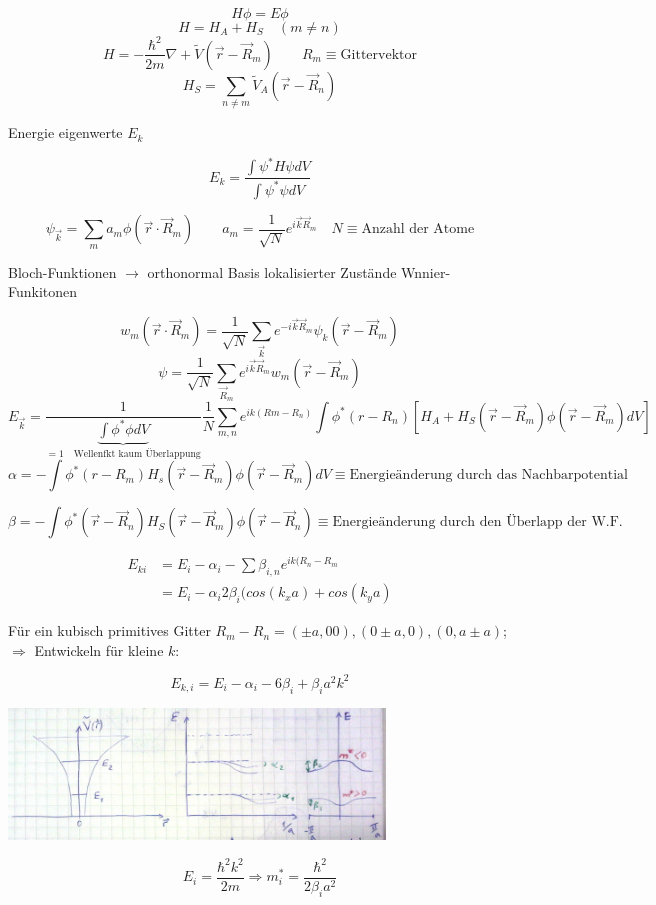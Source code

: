 \[H\phi = E\phi\]
\[H= H_A+H_S\quad (m\neq n)\]
\[H = -\frac{\hbar^2}{2m}\nabla + \tilde V(\vec r - \vec R_m)\qquad R_m\equiv\text{Gittervektor}\]
\[H_S = \sum_{n\neq m}\tilde V_A(\vec r - \vec R_n)\]

Energie eigenwerte \(E_k\)

\[ E_k = \frac{\int \psi^* H\psi dV}{\int \psi^*\psi dV}\]

 \[\psi_{\vec k} = \sum_m a_m\phi(\vec r\cdot\vec R_m)\qquad a_m=\frac{1}{\sqrt{N}} e^{i\vec k\vec R_m}\quad N\equiv\text{Anzahl der Atome}\]


Bloch-Funktionen \(\rightarrow \) orthonormal Basis lokalisierter Zustände Wnnier-Funkitonen

\[w_m(\vec r\cdot\vec R_m) = \frac{1}{\sqrt{N}}\sum_{\vec k}e^{-i\vec k\vec R_m}\psi_k(\vec r- \vec R_m)\]
\[\psi =\frac{1}{\sqrt{N}}\sum_{\vec R_m}e^{i\vec k\vec R_m}w_m(\vec r- \vec R_m) \]
\[E_{\vec k} = \frac{1}{\underbrace{\int \phi^*\phi dV}_{=1\quad\text{Wellenfkt kaum Überlappung}}}\frac{1}{N}\sum_{m,n}e^{ik(Rm-R_n)}\int\phi^*(r-R_n)[H_A+H_S(\vec r-\vec R_m)\phi(\vec r-\vec R_m)dV]\]
\[\alpha = -\int \phi^*(r-R_m)H_s(\vec r-\vec R_m)\phi(\vec r -\vec R_m)dV \equiv\text{Energieänderung durch das Nachbarpotential}\]

\[\beta = -\int \phi^*(\vec r- \vec R_n)H_S(\vec r-\vec R_m)\phi(\vec r-\vec R_n)\equiv\text{Energieänderung durch den Überlapp der W.F.}\]

\begin{align}
E_{ki} &= E_i - \alpha_i - \sum\beta_{i,n}e^{ik(R_n-R_m}\\
&= E_i - \alpha_i2\beta_{i}(cos(k_xa)+cos(k_y a)
\end{align}

Für ein kubisch primitives Gitter \(R_m-R_n=(\pm a,00),(0\pm a,0),(0,a\pm a)\); \(\Rightarrow \) Entwickeln für kleine \(k\):

\[E_{k,i}=E_i - \alpha_i-6\beta_i+\beta_i a^2k^2\]



\includegraphics[width=0.75\textwidth]{kap06_41.png}

\[E_i=\frac{\hbar^2k^2}{2m}\Rightarrow m^*_i=\frac{\hbar^2}{2\beta_ia^2}\]

